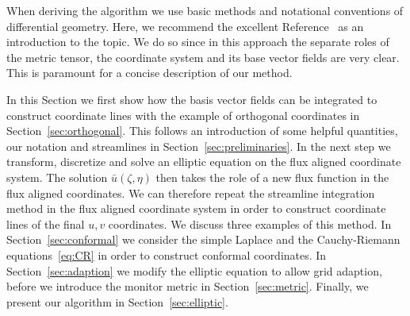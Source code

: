 \documentclass{hitec} %
\begin{document}
When deriving the algorithm we use basic methods and notational 
conventions of differential geometry.  
Here, we recommend the excellent Reference~\cite{Frankel} as an introduction to the topic.  
We do so since in this approach the separate roles of the metric tensor, 
the coordinate system and its base vector fields are very clear. This is 
paramount for a concise description of our method. 


In this Section we first show how the
basis vector fields can be integrated to construct coordinate lines
 with the example of orthogonal coordinates in Section~\ref{sec:orthogonal}. This follows
an introduction of some helpful quantities, our notation and streamlines
in Section~\ref{sec:preliminaries}. 
In the next step we transform, discretize and solve an elliptic equation on the flux aligned
coordinate system.
The solution $\bar u(\zeta, \eta)$ then takes the role of a new flux function in the flux aligned coordinates. 
We can therefore repeat the streamline integration method in the flux aligned
coordinate system in order to construct coordinate lines of the final $u,v$ coordinates.
We discuss three examples of this method.
In 
Section~\ref{sec:conformal} we consider the simple Laplace and the Cauchy-Riemann equations~\eqref{eq:CR}
in order to construct conformal coordinates.
In Section~\ref{sec:adaption} we modify the elliptic equation to allow grid adaption, before
we introduce the monitor metric in Section~\ref{sec:metric}. 
Finally, we present our algorithm in Section~\ref{sec:elliptic}. 
\end{document}
